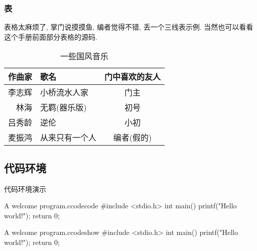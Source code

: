 \documentclass[hyperref,UTF8,11pt,CJK]{beamer}
\begin{document}
\cprotEnv\begin{frame}
	\frametitle{表}
	表格太麻烦了, 掌门说摸摸鱼, 编者觉得不错, 丢一个三线表示例. 当然也可以看看这个手册前面部分表格的源码.
	\begin{table}[htbp]
		\centering
		\caption{一些国风音乐}
		\label{tab:YixieGfyy}
		\begin{tabular}{rlc}
			\toprule
			作曲家 & 歌名 & 门中喜欢的友人 \\
			\midrule
			李志辉 & 小桥流水人家 & 门主 \\
			林海 & 无羁(器乐版) & 初号 \\
			吕秀龄 & 逆伦 & 小初 \\
			麦振鸿 & 从来只有一个人 & 编者(假的) \\
			\bottomrule
		\end{tabular}
	\end{table}
\end{frame}

\subsection{代码环境}
\begin{frame}[fragile]{代码环境演示}
	\begin{scucode}[]{A welcome program.}{c}{}{codecode}
#include <stdio.h>
int main() {
    printf("Hello world!\n");
    return 0;
}
\end{scucode}
	\begin{scushow}[]{A welcome program.}{c}{}{codeshow}
#include <stdio.h>
int main() {
    printf("Hello world!\n");
    return 0;
}
\end{scushow}
\end{frame}
\end{document}
